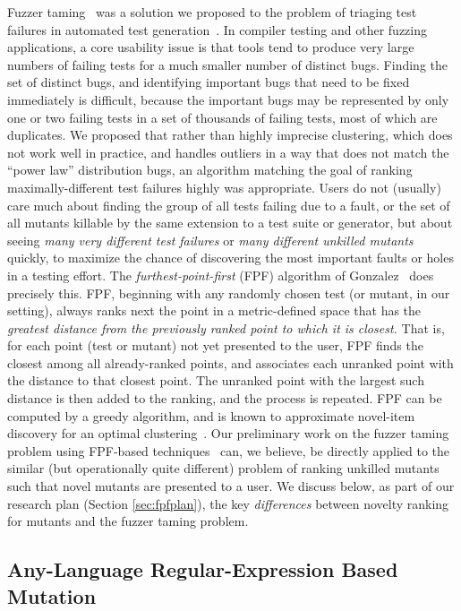 Fuzzer taming~\cite{PLDI13} was a solution we proposed to the problem
of triaging test failures in automated test generation~\cite{SemCrash}.  In compiler
testing and other fuzzing applications, a core usability issue is that
tools tend to produce very large numbers of failing tests for a much
smaller number of distinct bugs.  Finding the set of distinct bugs,
and identifying important bugs that need to be fixed immediately is
difficult, because the important bugs may be represented by only one
or two failing tests in a set of thousands of failing tests, most of
which are duplicates.  We proposed that rather than highly imprecise
clustering, which does not work well in practice, and handles outliers
in a way that does not match the ``power law'' distribution bugs, an
algorithm matching the goal of ranking maximally-different test
failures highly was appropriate.  Users do not (usually) care much
about finding the group of all tests failing due to a fault, or the
set of all mutants killable by the same extension to a test suite or
generator, but about seeing \emph{many very different test failures} or \emph{many
  different unkilled mutants} quickly, to maximize the chance of
discovering the most important faults or holes in a testing effort.
The \emph{furthest-point-first} (FPF) algorithm of
Gonzalez~\cite{Gonzalez85} does precisely this.  FPF, beginning with
any randomly chosen test (or mutant, in our setting), always ranks
next the point in a metric-defined space that has the \emph{greatest
  distance from the previously ranked point to which it is closest.}
That is, for each point (test or mutant) not yet presented to the
user, FPF finds the closest among all already-ranked points, and
associates each unranked point with the distance to that closest
point.  The unranked point with the largest such distance is then
added to the ranking, and the process is repeated.  FPF can be
computed by a greedy algorithm, and is known to approximate novel-item
discovery for an optimal clustering~\cite{Gonzalez85}.  Our
preliminary work on the fuzzer taming problem using FPF-based
techniques~\cite{PLDI13,distMut} can, we believe, be directly applied
to the similar (but operationally quite different) problem of ranking
unkilled mutants such that novel mutants are presented to a user.  We
discuss below, as part of our research plan (Section
\ref{sec:fpfplan}), the key \emph{differences} between novelty ranking
for mutants and
the fuzzer taming problem.

\subsection{Any-Language Regular-Expression Based Mutation}


